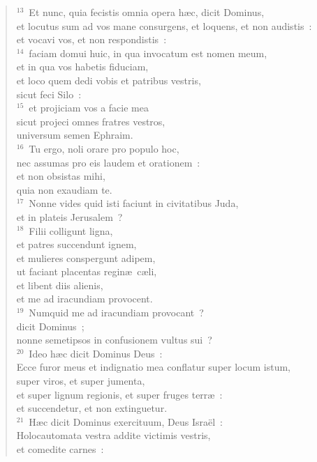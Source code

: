 \begin{verse}
${}^{13}$~Et nunc, quia fecistis omnia opera h\ae c, dicit Dominus,\\ et locutus sum ad vos mane consurgens, et loquens, et non audistis~:\\ et vocavi vos, et non respondistis~:\\
${}^{14}$~faciam domui huic, in qua invocatum est nomen meum,\\ et in qua vos habetis fiduciam,\\ et loco quem dedi vobis et patribus vestris,\\ sicut feci Silo~:\\
${}^{15}$~et projiciam vos a facie mea\\ sicut projeci omnes fratres vestros,\\ universum semen Ephraim.\\
${}^{16}$~Tu ergo, noli orare pro populo hoc,\\ nec assumas pro eis laudem et orationem~:\\ et non obsistas mihi,\\ quia non exaudiam te.\\
${}^{17}$~Nonne vides quid isti faciunt in civitatibus Juda,\\ et in plateis Jerusalem~?\\
${}^{18}$~Filii colligunt ligna,\\ et patres succendunt ignem,\\ et mulieres conspergunt adipem,\\ ut faciant placentas regin\ae\ c\ae li,\\ et libent diis alienis,\\ et me ad iracundiam provocent.\\
${}^{19}$~Numquid me ad iracundiam provocant~?\\ dicit Dominus~;\\ nonne semetipsos in confusionem vultus sui~?\\
${}^{20}$~Ideo h\ae c dicit Dominus Deus~:\\ Ecce furor meus et indignatio mea conflatur super locum istum,\\ super viros, et super jumenta,\\ et super lignum regionis, et super fruges terr\ae~:\\ et succendetur, et non extinguetur.\\
${}^{21}$~H\ae c dicit Dominus exercituum, Deus Isra\"el~:\\ Holocautomata vestra addite victimis vestris,\\ et comedite carnes~:\\

\end{verse}
